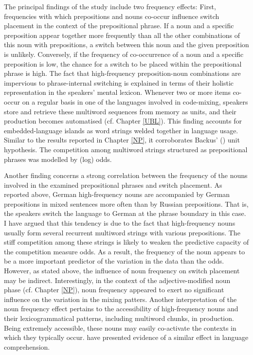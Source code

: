 The principal findings of the study include two frequency effects: First, frequencies with which prepositions and nouns co-occur influence switch placement in the context of the prepositional phrase. If a noun and a specific preposition appear together more frequently than all the other combinations of this noun with prepositions, a switch between this noun and the given preposition is unlikely. Conversely, if the frequency of co-occurrence of a noun and a specific preposition is low, the chance for a switch to be placed within the prepositional phrase is high. The fact that high-frequency preposition-noun combinations are impervious to phrase-internal switching is explained in terms of their holistic representation in the speakers' mental lexicon. Whenever two or more items co-occur on a regular basis in one of the languages involved in code-mixing, speakers store and retrieve these multiword sequences from memory as units, and their production becomes automatised (cf. Chapter \ref{UBL}). This finding accounts for embedded-language islands as word strings welded together in language usage. Similar to the results reported in Chapter \ref{NP}, it  corroborates Backus’ (\citeyear{backus-units-2003}) unit hypothesis. The competition among multiword strings structured as prepositional phrases was modelled by (log) odds. 

Another finding concerns a strong correlation between the frequency of the nouns involved in the examined prepositional phrases and switch placement. As reported above, German high-frequency nouns are accompanied by German prepositions in mixed sentences more often than by Russian prepositions. That is, the speakers switch the language to German at the phrase boundary in this case. I have argued that this tendency is due to the fact that high-frequency nouns usually form several recurrent multiword strings with various prepositions. The stiff competition among these strings is likely to weaken the predictive capacity of the competition measure odds. As a result, the frequency of the noun appears to be a more important predictor of the variation in the data than the odds. However, as stated above, the influence of noun frequency on switch placement may be indirect. Interestingly, in the context of the adjective-modified noun phase (cf. Chapter \ref{NP}), noun frequency appeared to exert no significant influence on the variation in the mixing patters. Another interpretation of the noun frequency effect pertains to the accessibility of high-frequency nouns and their lexicogrammatical patterns, including multiword chunks, in production. Being extremely accessible, these nouns may easily co-activate the contexts in which they typically occur. \citet{arnon-snider} have presented evidence of a similar effect in language comprehension. 

